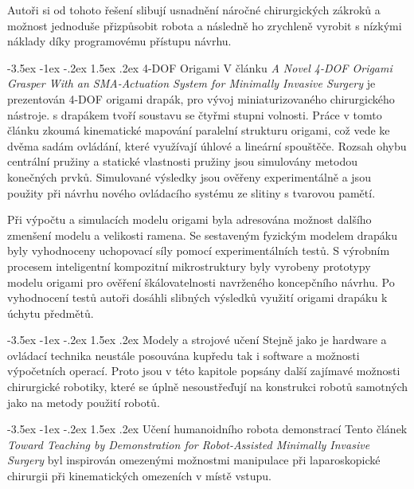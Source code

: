 \documentclass[10pt, a4paper]{article}
\makeatletter
\theoremstyle{definition}
\renewcommand\section{\@startsection {section}{1}{\z@}%
                                   {-3.5ex \@plus -1ex \@minus -.2ex}%
                                   {1.5ex \@plus.2ex}%
                                   {\large\bfseries}}
\renewcommand\subsection{\@startsection {subsection}{1}{\z@}%
                                   {-3.5ex \@plus -1ex \@minus -.2ex}%
                                   {1.5ex \@plus.2ex}%
                                   {\normalsize\bfseries}}
\makeatother
\begin{document}
Autoři si od tohoto řešení slibují usnadnění náročné chirurgických zákroků
a možnost jednoduše přizpůsobit robota a následně ho zrychleně vyrobit
s nízkými náklady díky programovému přístupu návrhu.

\subsection{4-DOF Origami}
\label{subsec:4DOF}
V článku \textit{A Novel 4-DOF Origami Grasper With an SMA-Actuation System for Minimally Invasive Surgery} \cite{4DOF}
je prezentován 4-DOF origami drapák, pro
vývoj miniaturizovaného chirurgického nástroje.
s drapákem tvoří soustavu se čtyřmi stupni volnosti.
Práce v tomto článku zkoumá kinematické mapování paralelní strukturu origami,
což vede ke dvěma sadám ovládání, které využívají úhlové a lineární spouštěče.
Rozsah ohybu centrální pružiny a statické vlastnosti pružiny
jsou simulovány metodou konečných prvků. Simulované výsledky jsou 
ověřeny experimentálně a jsou použity při návrhu
nového ovládacího systému ze slitiny s tvarovou pamětí.

Při výpočtu a simulacích modelu origami byla adresována
možnost dalšího zmenšení modelu a velikosti ramena.
Se sestaveným fyzickým modelem drapáku byly vyhodnoceny uchopovací síly 
pomocí experimentálních testů.
S výrobním procesem inteligentní kompozitní mikrostruktury
byly vyrobeny prototypy modelu origami
pro ověření škálovatelnosti navrženého koncepčního návrhu.
Po vyhodnocení testů autoři dosáhli slibných výsledků
využití origami drapáku k úchytu předmětů.


\section{Modely a strojové učení}
\label{sec:models}
Stejně jako je hardware a ovládací technika neustále posouvána kupředu
tak i software a možnosti výpočetních operací. Proto jsou v této kapitole
popsány další zajímavé možnosti chirurgické robotiky,
které se úplně nesoustřeďují na konstrukci robotů samotných jako
na metody použití robotů.

\subsection{Učení humanoidního robota demonstrací}
\label{subsec:teaching}
Tento článek \textit{Toward Teaching by Demonstration for Robot-Assisted Minimally Invasive Surgery} \cite{teaching_humanoid}
byl inspirován omezenými možnostmi manipulace při laparoskopické chirurgii
při kinematických omezeních v místě vstupu.
\end{document}
